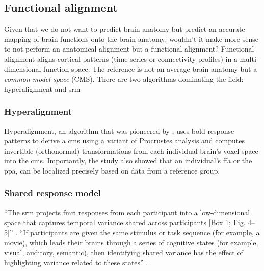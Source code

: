 \subsection{Functional alignment}
%
Given that we do not want to predict brain anatomy but predict an accurate
mapping of brain functions onto the brain anatomy:
%
wouldn't it make more sense to not perform an anatomical alignment but a
functional alignment?
%
Functional alignment aligns cortical patterns (time-series or connectivity
profiles) in a multi-dimensional function space.
The reference is not an average brain anatomy but a \textit{common model space}
(CMS).
%
There are two algorithms dominating the field: hyperalignment and \ac{srm}


\subsubsection{Hyperalignment}

%
Hyperalignment, an algorithm that was pioneered by \citet{haxby2011common}, uses
\ac{bold} response patterns to derive a \ac{cms} using a variant of Procrustes
analysis and computes invertible (orthonormal) transformations from each
individual brain's voxel-space into the \ac{cms}.
%
Importantly, the study also showed that an individual's \ac{ffa} or the
\ac{ppa}, can be localized precisely based on data from a reference group.


\subsubsection{Shared response model}



``The \ac{srm} \citep{chen2015reduced} projects \ac{fmri} responses from
each participant into a low-dimensional space that captures temporal variance
shared across participants [Box 1; Fig. 4–5]'' \citep{cohen2017computational}.
%
``If participants are given the same stimulus or task sequence (for example, a
movie), which leads their brains through a series of cognitive states (for
example, visual, auditory, semantic), then identifying shared variance has the
effect of highlighting variance related to these states''
\citep{cohen2017computational}.



